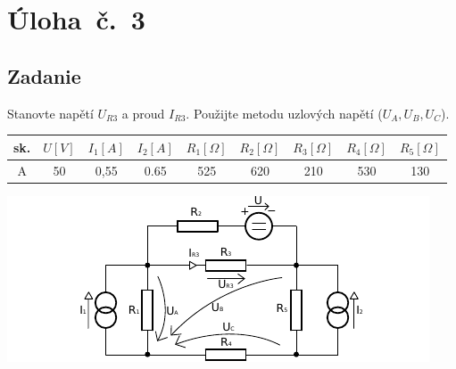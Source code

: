 \section{Úloha~č.~3}
\subsection{Zadanie}
Stanovte napětí $U_{R3}$ a proud $I_{R3}$. Použijte metodu uzlových napětí ($U_{A}, U_{B}, U_{C}$).
\begin{table}[H]
\begin{center}
  \begin{tabular}{|c|c|c|c|c|c|c|c|c|}
    \hline
    sk. &  $U [V]$ & $I_{1} [A]$ & $I_{2} [A]$ & $R_{1} [\Omega]$ &  $R_{2} [\Omega]$ &  $R_{3} [\Omega]$ &  $R_{4} [\Omega]$ &  $R_{5} [\Omega]$ \\ \hline
    A & 50 & 0,55 & 0.65 & 525 & 620 & 210 & 530 & 130 \\ \hline
  \end{tabular}
\end{center}
\end{table}
\begin{center}
  \includegraphics[width=0.8\columnwidth,keepaspectratio]{res/u3o1}
\end{center}

